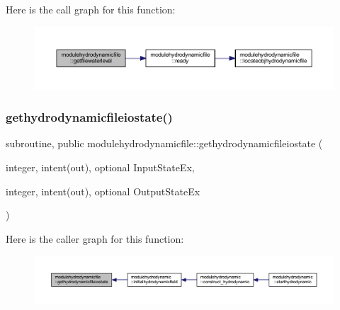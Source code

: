 Here is the call graph for this function\+:\nopagebreak
\begin{figure}[H]
\begin{center}
\leavevmode
\includegraphics[width=350pt]{namespacemodulehydrodynamicfile_af996537253af14e50e63530e5814f6bb_cgraph}
\end{center}
\end{figure}
\mbox{\label{namespacemodulehydrodynamicfile_a8095cd04310d0ed954d72fb7021c5141}} 
\subsubsection{\texorpdfstring{gethydrodynamicfileiostate()}{gethydrodynamicfileiostate()}}
{\footnotesize\ttfamily subroutine, public modulehydrodynamicfile\+::gethydrodynamicfileiostate (\begin{DoxyParamCaption}\item[{integer, intent(out), optional}]{Input\+State\+Ex,  }\item[{integer, intent(out), optional}]{Output\+State\+Ex }\end{DoxyParamCaption})}

Here is the caller graph for this function\+:\nopagebreak
\begin{figure}[H]
\begin{center}
\leavevmode
\includegraphics[width=350pt]{namespacemodulehydrodynamicfile_a8095cd04310d0ed954d72fb7021c5141_icgraph}
\end{center}
\end{figure}
\mbox{\label{namespacemodulehydrodynamicfile_a091307ffd36898af46af80552e9243ab}} 
